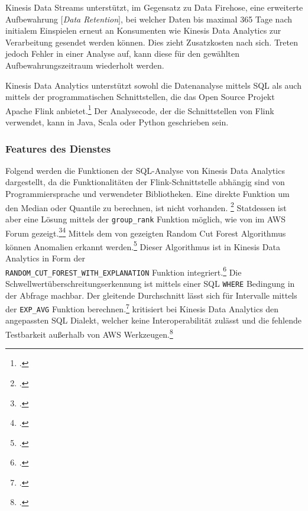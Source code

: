 Kinesis Data Streams unterstützt, im Gegensatz zu Data Firehose, eine erweiterte Aufbewahrung $\lbrack$\textit{Data Retention}$\rbrack$, bei welcher Daten bis maximal 365 Tage nach initialem Einspielen erneut an Konsumenten wie Kinesis Data Analytics zur Verarbeitung gesendet werden können. Dies zieht Zusatzkosten nach sich. Treten jedoch Fehler in einer Analyse auf, kann diese für den gewählten Aufbewahrungszeitraum wiederholt werden.

Kinesis Data Analytics unterstützt sowohl die Datenanalyse mittels \ac{SQL} als auch mittels der programmatischen Schnittstellen, die das Open Source Projekt Apache Flink anbietet.\footcite[Vgl.][]{AmazonWebServicesInc..2020f} Der Analysecode, der die Schnittstellen von Flink verwendet, kann in Java, Scala oder Python geschrieben sein.

\subsubsection{Features des Dienstes}
Folgend werden die Funktionen der \ac{SQL}-Analyse von Kinesis Data Analytics dargestellt, da die Funktionalitäten der Flink-Schnittstelle abhängig sind von Programmiersprache und verwendeter Bibliotheken. 
Eine direkte Funktion um den Median oder Quantile zu berechnen, ist nicht vorhanden. \footcite[Vgl.][]{RyanN.2018} Statdessen ist aber eine Lösung mittels der \texttt{group_rank} Funktion möglich, wie von \citeauthor{RyanN.2018} im \ac{AWS} Forum gezeigt.\footcite[Vgl.][]{AmazonWebServicesInc..o.J.as}\nzitat\footcite[Vgl.][]{RyanN.2018}
Mittels dem von \citeauthor{Guha.2016} gezeigten Random Cut Forest Algorithmus können Anomalien erkannt werden.\footcite[Vgl.][1]{Guha.2016} Dieser Algorithmus ist in Kinesis Data Analytics in Form der \\ \texttt{RANDOM_CUT_FOREST_WITH_EXPLANATION} Funktion integriert.\footcite[Vgl.][]{AmazonWebServicesInc..o.J.ar}
Die Schwellwertüberschreitungserkennung ist mittels einer \ac{SQL} \texttt{WHERE} Bedingung in der Abfrage machbar.
Der gleitende Durchschnitt lässt sich für Intervalle mittels der \texttt{EXP_AVG} Funktion berechnen.\footcite[Vgl.][]{AmazonWebServicesInc..o.J.aq}
\citeauthor{Herman.2020} kritisiert bei Kinesis Data Analytics den angepassten \ac{SQL} Dialekt, welcher keine Interoperabilität zulässt und die fehlende Testbarkeit außerhalb von \ac{AWS} Werkzeugen.\footcite[Vgl.][]{Herman.2020}

